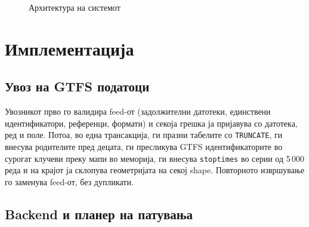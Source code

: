 \documentclass[11pt, a4paper]{article}
\renewcommand{\_}{\oldunderscore\allowbreak}
\newcommand{\code}[1]{\texttt{#1}}
\begin{document}
\begin{figure}[!htb]
\centering
{}
\caption{Архитектура на системот}
\label{fig:arch}
\end{figure}

\section{Имплементација}

\subsection{Увоз на GTFS податоци}

Увозникот прво го валидира feed-от (задолжителни датотеки, единствени идентификатори, референци, формати) и секоја грешка ја пријавува со датотека, ред и поле. Потоа, во една трансакција, ги празни табелите со \code{TRUNCATE}, ги внесува родителите пред децата, ги пресликува GTFS идентификаторите во сурогат клучеви преку мапи во меморија, ги внесува \code{stop\_times} во серии од 5\,000 реда и на крајот ја склопува геометријата на секој shape. Повторното извршување го заменува feed-от, без дупликати.

\subsection{Backend и планер на патувања}
\end{document}
